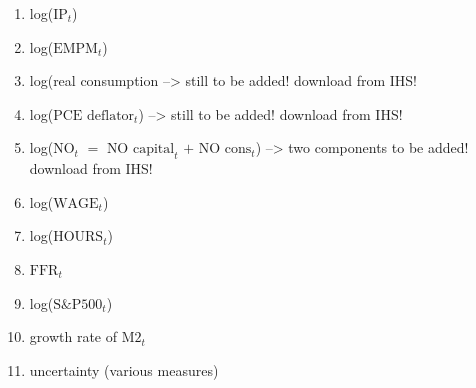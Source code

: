 \documentclass[a4paper,11pt,listof=nochaptergap,oneside,pointednumbers,bibtotoc,bigheadings,liststotoc]{scrbook}
\theoremstyle{mysatz}
\theoremstyle{mydefinition}
\theoremstyle{mybemerkung}
\begin{document}
\begingroup
\begin{spacing}{0.5}
    \fontsize{10pt}{12pt}\selectfont
\begin{enumerate}
	\item log($\text{IP}_t$)
	\item log($\text{EMPM}_t$)
	\item log(real consumption --> still to be added! download from IHS!
	\item log($\text{PCE deflator}_t$) --> still to be added! download from IHS!
	\item log($\text{NO}_t$ $=$ $\text{NO capital}_t$ $+$ $\text{NO cons}_t$) --> two components to be added! download from IHS!
	\item log($\text{WAGE}_t$)
	\item log($\text{HOURS}_t$)
	\item $\text{FFR}_t$
	\item log($\text{S\&P500}_t$)
	\item growth rate of $\text{M2}_t$
	\item uncertainty (various measures)
\end{enumerate}
\end{spacing}
\endgroup
\end{document}
